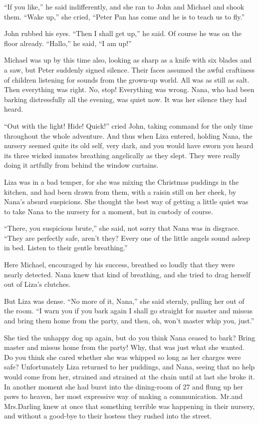 “If you like,” he said indifferently, and she ran to John and Michael and shook them.
“Wake up,” she cried, “Peter Pan has come and he is to teach us to fly.”

John rubbed his eyes.
“Then I shall get up,” he said.
Of course he was on the floor already.
“Hallo,” he said, “I am up!”

Michael was up by this time also, looking as sharp as a knife with six blades and a saw,
but Peter suddenly signed silence.
Their faces assumed the awful craftiness of children listening for sounds from the grown-up world.
All was as still as salt.
Then everything was right.
No, stop!
Everything was wrong.
Nana, who had been barking distressfully all the evening, was quiet now.
It was her silence they had heard.

“Out with the light!
Hide!
Quick!\@” cried John, taking command for the only time throughout the whole adventure.
And thus when Liza entered, holding Nana, the nursery seemed quite its old self, very dark,
and you would have sworn you heard its three wicked inmates breathing angelically as they slept.
They were really doing it artfully from behind the window curtains.

Liza was in a bad temper, for she was mixing the Christmas puddings in the kitchen,
and had been drawn from them, with a raisin still on her cheek, by Nana’s absurd suspicions.
She thought the best way of getting a little quiet was to take Nana to the nursery for a moment,
but in custody of course.

“There, you suspicious brute,” she said, not sorry that Nana was in disgrace.
“They are perfectly safe, aren’t they?
Every one of the little angels sound asleep in bed.
Listen to their gentle breathing.”

Here Michael, encouraged by his success, breathed so loudly that they were nearly detected.
Nana knew that kind of breathing, and she tried to drag herself out of Liza’s clutches.

But Liza was dense.
“No more of it, Nana,” she said sternly, pulling her out of the room.
“I warn you if you bark again I shall go straight for master and missus and bring them home from the party,
and then, oh, won’t master whip you, just.”

She tied the unhappy dog up again, but do you think Nana ceased to bark?
Bring master and missus home from the party!
Why, that was just what she wanted.
Do you think she cared whether she was whipped so long as her charges were safe?
Unfortunately Liza returned to her puddings,
and Nana, seeing that no help would come from her, strained and strained at the chain until at last she broke it.
In another moment she had burst into the dining-room of 27 and flung up her paws to heaven,
her most expressive way of making a communication.
Mr.\@ and Mrs.\@ Darling knew at once that something terrible was happening in their nursery,
and without a good-bye to their hostess they rushed into the street.

